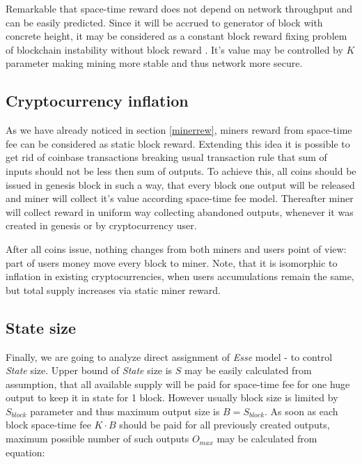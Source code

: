 \documentclass[]{article}   %
\newcommand{\authnote}[2]{\marginpar{\parbox{\marginparwidth}{\tiny %
  \textsf{#1 {\textcolor{blue}{notes: #2}}}}}%
  \textcolor{blue}{\textbf{\dag}}}
\newcommand{\authnote}[2]{
  \textsf{#1 \textcolor{blue}{: #2}}}
\newcommand{\authnote}[2]{}
\newcommand{\dnote}[1]{{\authnote{\textcolor{blue}{Dima notes}}{#1}}}
\newcommand{\esse}{\textit{Esse}}
\newcommand{\state}{\textit{State}}
\begin{document}
Remarkable that space-time reward does not depend on network throughput and can be easily predicted. Since it will be accrued to generator of block with concrete height, it may be considered as a constant block reward fixing problem of blockchain instability without block reward \cite{carlsten2016instability}. It's value may be controlled by $K$ parameter making mining more stable and thus network more secure.

\dnote{What is an output value when miner is interested in collecting it?}

\subsection{Cryptocurrency inflation}

As we have already noticed in section \ref{minerrew}, miners reward from space-time fee can be considered as static block reward. Extending this idea it is possible to get rid of coinbase transactions breaking usual transaction rule that sum of inputs should not be less then sum of outputs. To achieve this, all coins should be issued in genesis block in such a way, that every block one output will be released and miner will collect it's value according space-time fee model. Thereafter miner will collect reward in uniform way collecting abandoned outputs, whenever it was created in genesis or by cryptocurrency user.

After all coins issue, nothing changes from both miners and users point of view: part of users money move every block to miner. Note, that it is isomorphic to inflation in existing cryptocurrencies, when users accumulations remain the same, but total supply increases via static miner reward.

\subsection{State size}

Finally, we are going to analyze direct assignment of \esse{} model - to control \state{} size. Upper bound of \state{} size is $S$ may be easily calculated from assumption, that all available supply will be paid for space-time fee for one huge output to keep it in state for 1 block. However usually block size is limited by $S_{block}$ parameter and thus maximum output size is $B = S_{block}$. As soon as each block space-time fee $K \cdot B$ should be paid for all previously created outputs, maximum possible number of such outputs $O_{max}$ may be calculated from equation:
\end{document}
